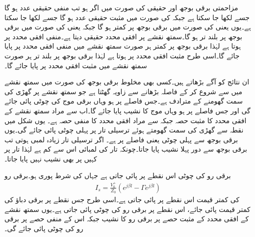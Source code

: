 مزاحمتی برقی بوجھ  اور حقیقی  کی صورت میں اگر  ہو تب  منفی حقیقی عدد ہو گا جسے   لکھا جا سکتا ہے جبکہ  کی صورت میں  مثبت حقیقی عدد ہو گا جسے   لکھا جا سکتا ہے۔یوں  یعنی  کی صورت میں برقی بوجھ پر کمتر  ہو گا جبکہ  یعنی  کی صورت میں برقی بوجھ پر بلند تر  ہو گا۔سمتھ نقشے پر افقی محدد حقیقی  دیتا ہے۔منفی افقی محدد پر   ہوتا ہے لہٰذا برقی بوجھ پر کمتر  ہر صورت سمتھ نقشے میں منفی افقی محدد پر پایا جائے گا۔اسی طرح مثبت افقی محدد پر   ہوتا ہے لہٰذا برقی بوجھ پر بلند تر  ہر صورت سمتھ نقشے میں مثبت افقی محدد پر پایا جائے گا۔

ان نتائج کو آگے بڑھاتے ہیں۔کسی بھی مخلوط برقی بوجھ  کی صورت میں سمتھ نقشے میں  سے شروع کر کے فاصلہ  بڑھانے سے زاویہ  گھٹتا ہے جو سمتھ نقشے پر گھڑی کی سمت گھومنے کے مترادف ہے۔جس فاصلے پر  ہو وہاں برقی موج کی چوٹی پائی جائے گی اور جس فاصلے پر  ہو وہاں موج کا نشیب پایا جائے گا۔اب  سے مراد سمتھ نقشے کے افقی محدد کا مثبت حصہ جبکہ
  سے مراد افقی محدد کا منفی حصہ ہے۔ یوں شکل  میں نقطہ  سے گھڑی کی سمت  گھومتے ہوئے  ترسیلی تار پر پہلی چوٹی پائی جائے گی۔یوں برقی بوجھ سے پہلی چوٹی  یعنی  فاصلے پر ہے۔ اگر ترسیلی تار زیادہ لمبی ہوتی تب برقی بوجھ سے  دور پہلا نشیب پایا جاتا۔چونکہ تار کی لمبائی اس سے کم ہے لہٰذا تار پر کہیں پر بھی نشیب نہیں پایا جاتا۔

برقی رو کی چوٹی اس نقطے پر پائی جاتی ہے جہاں  کی شرط پوری  ہو۔برقی رو
\begin{align*}
I_s=\frac{V_0^+}{Z_0} \left (e^{j \beta l}-\Gamma e^{j \beta l} \right)
\end{align*}
کی کمتر قیمت اس نقطے پر پائی جاتی ہے۔اسی طرح جس نقطے پر برقی دباؤ کی کمتر قیمت پائی جائے، اس نقطے پر برقی رو کی چوٹی پائی جاتی ہے۔یوں سمتھ نقشے کے افقی محدد کے مثبت حصے پر برقی رو کا نشیب جبکہ اس کے منفی حصے پر برقی رو کی چوٹی پائی جائے گی۔

